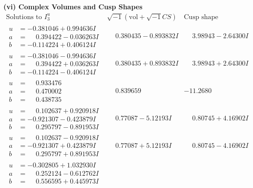 \documentclass[1p]{elsarticle_modified}
\theoremstyle{definition}
\newcommand{\I}{\sqrt{-1}}
\begin{document}
\newpage\flushleft \textbf{(vi) Complex Volumes and Cusp Shapes}
$$\begin{array}{c|c|c}  
\text{Solutions to }I^u_{3}& \I (\text{vol} + \sqrt{-1}CS) & \text{Cusp shape}\\
 \hline 
\begin{aligned}
u &= -0.381046 + 0.994636 I \\
a &= \phantom{-}0.394422 - 0.036263 I \\
b &= -0.114224 + 0.406124 I\end{aligned}
 & \phantom{-}0.380435 - 0.893832 I & \phantom{-}3.98943 - 2.64300 I \\ \hline\begin{aligned}
u &= -0.381046 - 0.994636 I \\
a &= \phantom{-}0.394422 + 0.036263 I \\
b &= -0.114224 - 0.406124 I\end{aligned}
 & \phantom{-}0.380435 + 0.893832 I & \phantom{-}3.98943 + 2.64300 I \\ \hline\begin{aligned}
u &= \phantom{-}0.933476\phantom{ +0.000000I} \\
a &= \phantom{-}0.470002\phantom{ +0.000000I} \\
b &= \phantom{-}0.438735\phantom{ +0.000000I}\end{aligned}
 & \phantom{-}0.839659\phantom{ +0.000000I} & -11.2680\phantom{ +0.000000I} \\ \hline\begin{aligned}
u &= \phantom{-}0.102637 + 0.920918 I \\
a &= -0.921307 - 0.423879 I \\
b &= \phantom{-}0.295797 - 0.891953 I\end{aligned}
 & \phantom{-}0.77087 - 5.12193 I & \phantom{-}0.80745 + 4.16902 I \\ \hline\begin{aligned}
u &= \phantom{-}0.102637 - 0.920918 I \\
a &= -0.921307 + 0.423879 I \\
b &= \phantom{-}0.295797 + 0.891953 I\end{aligned}
 & \phantom{-}0.77087 + 5.12193 I & \phantom{-}0.80745 - 4.16902 I \\ \hline\begin{aligned}
u &= -0.302805 + 1.032930 I \\
a &= \phantom{-}0.252124 - 0.612762 I \\
b &= \phantom{-}0.556595 + 0.445973 I\end{aligned}

\end{array}$$
\end{document}
